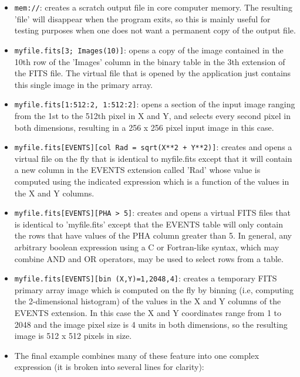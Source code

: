 \documentclass[11pt]{book}
\begin{document}
\begin{itemize}
\item
{\tt mem://}:  creates a scratch output file in core computer memory.  The
resulting 'file' will disappear when the program exits, so this
is mainly useful for testing purposes when one does not want a
permanent copy of the output file.

\item
{\tt myfile.fits[3; Images(10)]}: opens a copy of the image contained in the
10th row of the 'Images' column in the binary table in the 3th extension
of the FITS file.  The virtual file that is opened by the application just
contains this single image in the primary array.

\item
{\tt myfile.fits[1:512:2, 1:512:2]}: opens a section of the input image
ranging from the 1st to the 512th pixel in  X and Y, and selects every
second pixel in both dimensions, resulting in a 256 x 256 pixel input image
in this case.

\item
{\tt myfile.fits[EVENTS][col Rad = sqrt(X**2 + Y**2)]}:  creates and opens
a virtual file on the fly that is identical to
myfile.fits except that it will contain a new column in the EVENTS
extension called 'Rad' whose value is computed using the indicated
expression which is a function of the values in the X and Y columns.

\item
{\tt myfile.fits[EVENTS][PHA > 5]}:  creates and opens a virtual FITS
files that is identical to 'myfile.fits' except that the EVENTS table
will only contain the rows that have values of the PHA column greater
than 5.  In general, any arbitrary boolean expression using a C or
Fortran-like syntax, which may combine AND and OR operators,
may be used to select rows from a table.

\item
{\tt myfile.fits[EVENTS][bin (X,Y)=1,2048,4]}:  creates a temporary FITS
primary array image which is computed on the fly by binning (i.e,
computing the 2-dimensional histogram) of the values in the X and Y
columns of the EVENTS extension.  In this case the X and Y coordinates
range from 1 to 2048 and the image pixel size is 4 units in both
dimensions, so the resulting image is 512 x 512 pixels in size.

\item
The final example combines many of these feature into one complex
expression (it is broken into several lines for clarity):


\end{itemize}
\end{document}
